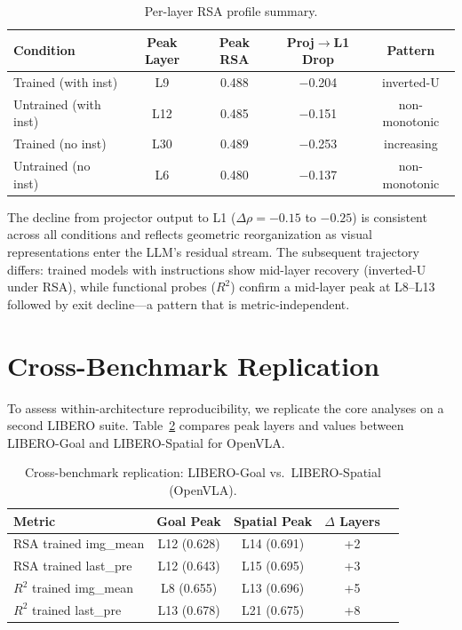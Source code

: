 \documentclass[10pt,letterpaper]{article}
\begin{document}
\begin{table}[h]
\centering
\caption{Per-layer RSA profile summary.}
\label{tab:perlayer_rsa}
\begin{tabular}{lcccc}
\toprule
Condition & Peak Layer & Peak RSA & Proj$\to$L1 Drop & Pattern \\
\midrule
Trained (with inst) & L9 & 0.488 & $-$0.204 & inverted-U \\
Untrained (with inst) & L12 & 0.485 & $-$0.151 & non-monotonic \\
Trained (no inst) & L30 & 0.489 & $-$0.253 & increasing \\
Untrained (no inst) & L6 & 0.480 & $-$0.137 & non-monotonic \\
\bottomrule
\end{tabular}
\end{table}

The decline from projector output to L1 ($\Delta\rho = -0.15$ to $-0.25$) is consistent across all conditions and reflects geometric reorganization as visual representations enter the LLM's residual stream. The subsequent trajectory differs: trained models with instructions show mid-layer recovery (inverted-U under RSA), while functional probes ($R^2$) confirm a mid-layer peak at L8--L13 followed by exit decline---a pattern that is metric-independent.

\section{Cross-Benchmark Replication}
\label{sec:cross_bench}

To assess within-architecture reproducibility, we replicate the core analyses on a second LIBERO suite. Table~\ref{tab:cross_bench} compares peak layers and values between LIBERO-Goal and LIBERO-Spatial for OpenVLA.

\begin{table}[h]
\centering
\caption{Cross-benchmark replication: LIBERO-Goal vs.\ LIBERO-Spatial (OpenVLA).}
\label{tab:cross_bench}
\begin{tabular}{lcccc}
\toprule
Metric & Goal Peak & Spatial Peak & $\Delta$ Layers \\
\midrule
RSA trained img\_mean & L12 (0.628) & L14 (0.691) & +2 \\
RSA trained last\_pre & L12 (0.643) & L15 (0.695) & +3 \\
$R^2$ trained img\_mean & L8 (0.655) & L13 (0.696) & +5 \\
$R^2$ trained last\_pre & L13 (0.678) & L21 (0.675) & +8 \\
\bottomrule
\end{tabular}
\end{table}
\end{document}
